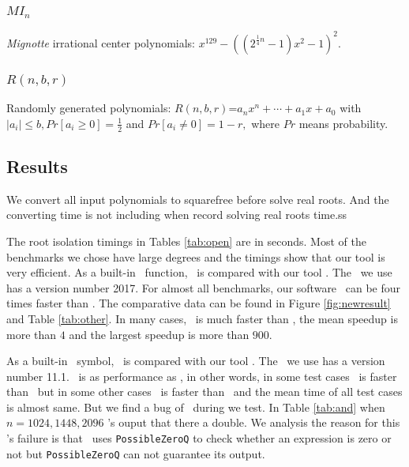  \subsubsection{$MI_n$} {\it Mignotte} irrational center polynomials: $x^{129}-((2^{\frac{1}{4}n}-1)x^2-1)^2$.


 \subsubsection{$R(n,b,r) $} Randomly generated polynomials: $R(n,b,r)$=$a_nx^n+\cdots+a_1x+a_0$ with $|a_i|\le b, Pr[a_i\ge 0]=\frac{1}{2}$ and  $Pr[a_i\neq 0] =1-r,$ where $Pr$ means probability.
 
 

 \subsection{Results}
 {\color{red}
We  convert  all input polynomials to squarefree before
solve real roots. And the  converting time is not including when record
solving real roots time.ss}

 The root isolation timings in Tables \ref{tab:open} are in seconds.  Most of the benchmarks we chose have large degrees and the timings show that our tool is very efficient.
As a  built-in  \MAPLE\ function, \REALROOT\ is    compared with  our tool \froot.
 	The   \MAPLE\  we use has a version number 2017.  For  almost all
 benchmarks, our  software \froot\  can be  four  times faster than \REALROOT. The comparative data can be found in Figure \ref{fig:newresult} and Table \ref{tab:other}. In many cases, \froot\ is much faster than \REALROOT, the mean speedup is more than $4$ and the largest speedup is more than $900$.


 As a  built-in \MM\ symbol, \inte\ is    compared with  our tool \froot. The  \MM\  we use has a version number 11.1. {\color{red}
 	\froot\ is as performance as \inte, in other words, in some test cases \froot\ is faster than \inte\ but in some other cases \inte\ is faster than \froot\ and the mean time of all test cases is  almost same.
 	  But we find a bug of  \MM\  during we test. In Table  \ref{tab:and} when $n=1024,1448,2096$  \inte's ouput that there a double. We analysis the reason for this \inte's failure is that \inte\ uses {\tt PossibleZeroQ} to check whether an expression is zero or not but  {\tt PossibleZeroQ} can not guarantee its output.}
 
